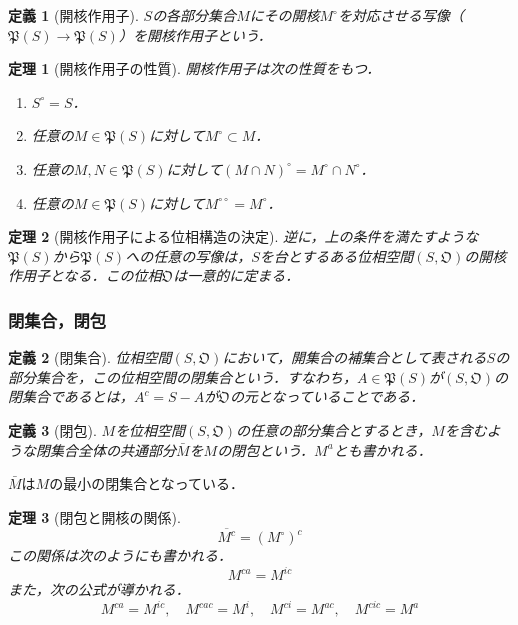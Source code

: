 \documentclass[a4paper,10pt,uplatex]{jsarticle}
\numberwithin{equation}{section}
\theoremstyle{mystyle}
\newtheorem{dfn}{定義}[section]
\newtheorem{thm}{定理}[section]
\newcommand{\gO}{\mathfrak{O}}
\newcommand{\gP}{\mathfrak{P}}
\begin{document}
\begin{dfn}[開核作用子]
    $S$の各部分集合$M$にその開核$M^\circ$を対応させる写像（$\gP(S)\to\gP(S)$）を開核作用子という．
\end{dfn}

\begin{thm}[開核作用子の性質]
    開核作用子は次の性質をもつ．
    \begin{enumerate}
        \item $S^\circ = S$．
        \item 任意の$M\in\gP(S)$に対して$M^\circ \subset M$．
        \item 任意の$M,N \in \gP(S)$に対して$(M \cap N)^\circ = M^\circ \cap N^\circ$．
        \item 任意の$M \in \gP(S)$に対して$M^{\circ\circ} = M^\circ$．
    \end{enumerate}
\end{thm}

\begin{thm}[開核作用子による位相構造の決定]
    逆に，上の条件を満たすような$\gP(S)$から$\gP(S)$への任意の写像は，$S$を台とするある位相空間$(S,\gO)$の開核作用子となる．この位相$\gO$は一意的に定まる．
\end{thm}

\subsubsection{閉集合，閉包}
\begin{dfn}[閉集合]
    位相空間$(S,\gO)$において，開集合の補集合として表される$S$の部分集合を，この位相空間の閉集合という．すなわち，$A\in\gP(S)$が$(S,\gO)$の閉集合であるとは，$A^c=S-A$が$\gO$の元となっていることである．
\end{dfn}

\begin{dfn}[閉包]
    $M$を位相空間$(S,\gO)$の任意の部分集合とするとき，$M$を含むような閉集合全体の共通部分$\bar{M}$を$M$の閉包という．$M^a$とも書かれる．
\end{dfn}
$\bar{M}$は$M$の最小の閉集合となっている．

\begin{thm}[閉包と開核の関係]
    \begin{equation}
        \overline{M^c} = (M^\circ)^c
    \end{equation}
    この関係は次のようにも書かれる．
    \begin{equation}
        M^{ca} = M^{ic}
    \end{equation}
    また，次の公式が導かれる．
    \begin{equation}
        M^{ca} = M^{ic}, \quad M^{cac} = M^i, \quad M^{ci} = M^{ac}, \quad M^{cic} = M^a
    \end{equation}
\end{thm}
\end{document}
